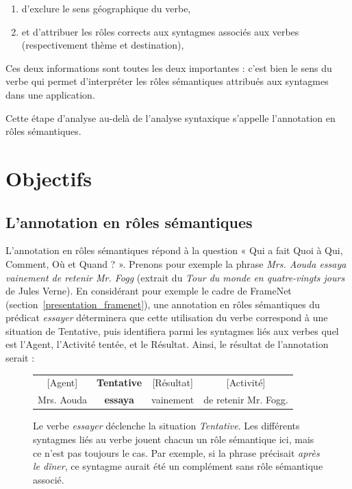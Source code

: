 \begin{enumerate}
    \item d'exclure le sens géographique du verbe,
    \item et d'attribuer les rôles corrects aux syntagmes associés aux verbes
        (respectivement thème et destination),
\end{enumerate}


Ces deux informations sont toutes les deux importantes : c'est bien le sens du
verbe qui permet d'interpréter les rôles sémantiques attribués aux syntagmes
dans une application.

Cette étape d'analyse au-delà de l'analyse syntaxique s'appelle l'annotation en
rôles sémantiques.

\section{Objectifs}
\label{objectifs_these}

\subsection{L'annotation en rôles sémantiques}

L'annotation en rôles sémantiques répond à la question « Qui a fait Quoi à Qui,
Comment, Où et Quand ? ». Prenons pour exemple la phrase \textit{Mrs. Aouda
essaya vainement de retenir Mr. Fogg} (extrait du \textit{Tour du monde en
quatre-vingts jours} de Jules Verne). En considérant pour exemple le cadre de
FrameNet (section~\ref{presentation_framenet}), une annotation en rôles
sémantiques du prédicat \textit{essayer} déterminera que cette utilisation du
verbe correspond à une situation de Tentative, puis identifiera parmi les
syntagmes liés aux verbes quel est l'Agent, l'Activité tentée, et le Résultat.
Ainsi, le résultat de l'annotation serait :

\begin{figure}[ht]
    \centering
    \begin{tabular}{cccc}
    [Agent]  & \textbf{Tentative} & [Résultat]  & [Activité]         \tabularnewline
    Mrs. Aouda & \textbf{essaya}  & vainement & de retenir Mr. Fogg. \tabularnewline
    \end{tabular}
    \caption{\label{fig:introsrl}Le verbe \textit{essayer} déclenche la situation
        \textit{Tentative}. Les différents syntagmes liés au verbe jouent chacun
        un rôle sémantique ici, mais ce n'est pas toujours le cas. Par exemple,
        si la phrase précisait \textit{après le dîner}, ce syntagme aurait été un
    complément sans rôle sémantique associé.}

\end{figure}

